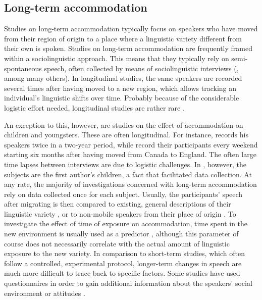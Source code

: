 \documentclass[output=paper]{langscibook}
\begin{document}
\subsection{Long-term accommodation}
\begin{sloppypar}
Studies on long-term accommodation typically focus on speakers who have moved from their region of origin to a place where a linguistic variety different from their own is spoken. Studies on long-term accommodation are frequently framed within a sociolinguistic approach. This means that they typically rely on semi-spontaneous speech, often collected by means of sociolinguistic interviews (\cite{shockey_all_1984, auer_subjective_1998, romera_prosodic_2013}, among many others). In longitudinal studies, the same speakers are recorded several times after having moved to a new region, which allows tracking an individual's linguistic shifts over time. Probably because of the considerable logistic effort needed, longitudinal studies are rather rare \citep[but see][]{shockey_all_1984,auer_subjective_1998,reubold_dissociating_2015}.
\end{sloppypar}

An exception to this, however, are studies on the effect of accommodation on children and youngsters. These are often longitudinal. For instance, \citet{chambers_dialect_1992} records his speakers twice in a two-year period, while \citet{tagliamonte_howd_2007} record their participants every weekend starting six months after having moved from Canada to England. The often large time lapses between interviews are due to logistic challenges. In \citet{tagliamonte_howd_2007}, however, the subjects are the first author's children, a fact that facilitated data collection. At any rate, the majority of investigations concerned with long-term accommodation rely on data collected once for each subject. Usually, the participants' speech after migrating is then compared to existing, general descriptions of their linguistic variety \citep{shockey_all_1984, trudgill_dialects_1986, MolinaMartos2010}, or to non-mobile speakers from their place of origin \citep{PalaciosAlcaine2007,Fernandez2013}. To investigate the effect of time of exposure on accommodation, time spent in the new environment is usually used as a predictor \citep{shockey_all_1984, romera_prosodic_2013, erker_contact_2016}, although this parameter of course does not necessarily correlate with the actual amount of linguistic exposure to the new variety. In comparison to short-term studies, which often follow a controlled, experimental protocol, longer-term changes in speech are much more difficult to trace back to specific factors. Some studies have used questionnaires in order to gain additional information about the speakers' social environment or attitudes \citep[e.g.][]{pesqueira_cambio_2008}.
\end{document}
